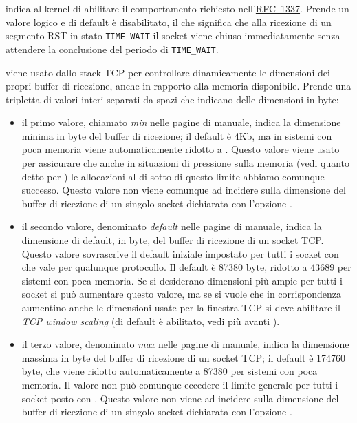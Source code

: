 \begin{basedescript}{\desclabelwidth{2.2cm}\desclabelstyle{\nextlinelabel}}
\item[\sysctlrelfiled{net/ipv4}{tcp\_rfc1337}] indica al kernel di
  abilitare il comportamento richiesto
  nell'\href{http://www.ietf.org/rfc/rfc1337.txt}{RFC~1337}. Prende un valore
  logico e di default è disabilitato, il che significa che alla ricezione di
  un segmento RST in stato \texttt{TIME\_WAIT} il socket viene chiuso
  immediatamente senza attendere la conclusione del periodo di
  \texttt{TIME\_WAIT}.

\item[\sysctlrelfiled{net/ipv4}{tcp\_rmem}] viene usato dallo stack TCP
  per controllare dinamicamente le dimensioni dei propri buffer di ricezione,
  anche in rapporto alla memoria disponibile.  Prende una tripletta di valori
  interi separati da spazi che indicano delle dimensioni in byte:

  \begin{itemize}
  \item il primo valore, chiamato \textit{min} nelle pagine di manuale, indica
    la dimensione minima in byte del buffer di ricezione; il default è 4Kb, ma
    in sistemi con poca memoria viene automaticamente ridotto a
    .  Questo valore viene usato per assicurare che anche in
    situazioni di pressione sulla memoria (vedi quanto detto per
    ) le allocazioni al di sotto di
    questo limite abbiamo comunque successo.  Questo valore non viene comunque
    ad incidere sulla dimensione del buffer di ricezione di un singolo socket
    dichiarata con l'opzione .

  \item il secondo valore, denominato \textit{default} nelle pagine di
    manuale, indica la dimensione di default, in byte, del buffer di ricezione
    di un socket TCP.  Questo valore sovrascrive il default iniziale impostato
    per tutti i socket con  che vale per
    qualunque protocollo. Il default è 87380 byte, ridotto a 43689 per sistemi
    con poca memoria. Se si desiderano dimensioni più ampie per tutti i socket
    si può aumentare questo valore, ma se si vuole che in corrispondenza
    aumentino anche le dimensioni usate per la finestra TCP si deve abilitare
    il \textit{TCP window scaling} (di default è abilitato, vedi più avanti
    ).

  \item il terzo valore, denominato \textit{max} nelle pagine di manuale,
    indica la dimensione massima in byte del buffer di ricezione di un socket
    TCP; il default è 174760 byte, che viene ridotto automaticamente a 87380
    per sistemi con poca memoria. Il valore non può comunque eccedere il
    limite generale per tutti i socket posto con
    . Questo valore non viene ad
    incidere sulla dimensione del buffer di ricezione di un singolo socket
    dichiarata con l'opzione .
  \end{itemize}


\end{basedescript}
